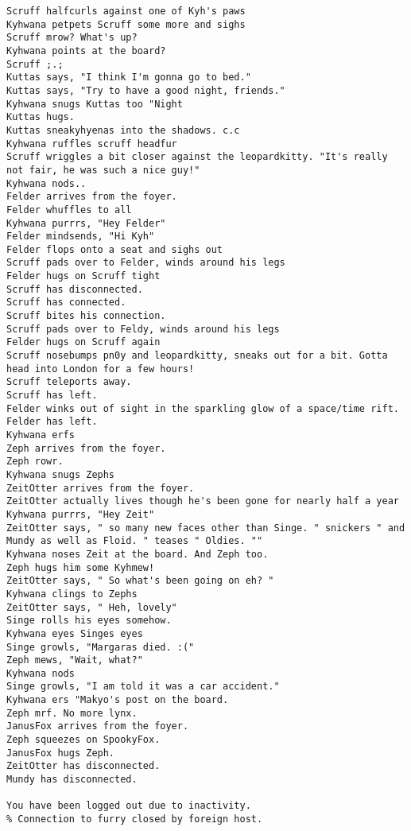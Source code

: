 \begin{verbatim}
Scruff halfcurls against one of Kyh's paws
Kyhwana petpets Scruff some more and sighs
Scruff mrow? What's up?
Kyhwana points at the board?
Scruff ;.;
Kuttas says, "I think I'm gonna go to bed."
Kuttas says, "Try to have a good night, friends."
Kyhwana snugs Kuttas too "Night
Kuttas hugs.
Kuttas sneakyhyenas into the shadows. c.c
Kyhwana ruffles scruff headfur
Scruff wriggles a bit closer against the leopardkitty. "It's really not fair, he was such a nice guy!"
Kyhwana nods..
Felder arrives from the foyer.
Felder whuffles to all
Kyhwana purrrs, "Hey Felder"
Felder mindsends, "Hi Kyh"
Felder flops onto a seat and sighs out
Scruff pads over to Felder, winds around his legs
Felder hugs on Scruff tight
Scruff has disconnected.
Scruff has connected.
Scruff bites his connection.
Scruff pads over to Feldy, winds around his legs
Felder hugs on Scruff again
Scruff nosebumps pn0y and leopardkitty, sneaks out for a bit. Gotta head into London for a few hours!
Scruff teleports away.
Scruff has left.
Felder winks out of sight in the sparkling glow of a space/time rift.
Felder has left.
Kyhwana erfs
Zeph arrives from the foyer.
Zeph rowr.
Kyhwana snugs Zephs
ZeitOtter arrives from the foyer.
ZeitOtter actually lives though he's been gone for nearly half a year
Kyhwana purrrs, "Hey Zeit"
ZeitOtter says, " so many new faces other than Singe. " snickers " and Mundy as well as Floid. " teases " Oldies. ""
Kyhwana noses Zeit at the board. And Zeph too.
Zeph hugs him some Kyhmew!
ZeitOtter says, " So what's been going on eh? "
Kyhwana clings to Zephs
ZeitOtter says, " Heh, lovely"
Singe rolls his eyes somehow.
Kyhwana eyes Singes eyes
Singe growls, "Margaras died. :("
Zeph mews, "Wait, what?"
Kyhwana nods
Singe growls, "I am told it was a car accident."
Kyhwana ers "Makyo's post on the board.
Zeph mrf. No more lynx.
JanusFox arrives from the foyer.
Zeph squeezes on SpookyFox.
JanusFox hugs Zeph.
ZeitOtter has disconnected.
Mundy has disconnected.

You have been logged out due to inactivity.
% Connection to furry closed by foreign host.
\end{verbatim}
